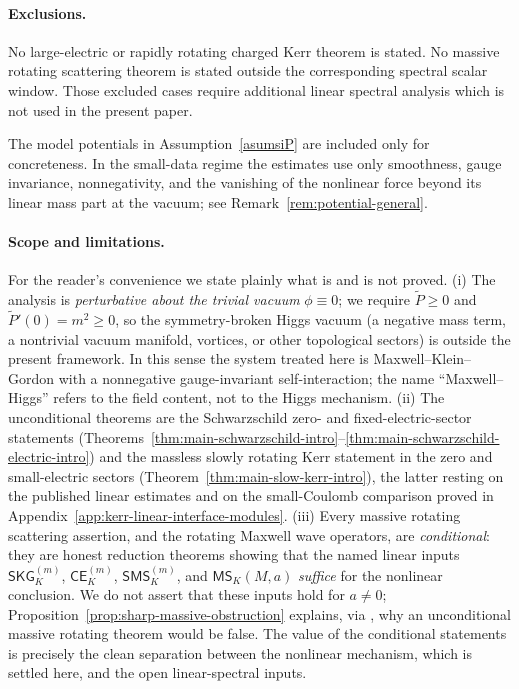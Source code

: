 \documentclass[11pt]{article}
\numberwithin{equation}{section}
\theoremstyle{plain}
\theoremstyle{definition}
\theoremstyle{remark}
\newcommand{\SKG}{\mathsf{SKG}}
\newcommand{\CElec}{\mathsf{CE}}
\newcommand{\MScat}{\mathsf{MS}}
\newcommand{\SMS}{\mathsf{SMS}}
\begin{document}
\paragraph{Exclusions.}
No large-electric or rapidly rotating charged Kerr theorem is stated.  No massive rotating scattering theorem is stated outside the corresponding spectral scalar window.  Those excluded cases require additional linear spectral analysis which is not used in the present paper.

The model potentials in Assumption~\ref{asumsiP} are included only for concreteness.  In the small-data regime the estimates use only smoothness, gauge invariance, nonnegativity, and the vanishing of the nonlinear force beyond its linear mass part at the vacuum; see Remark~\ref{rem:potential-general}.

\paragraph{Scope and limitations.}
For the reader's convenience we state plainly what is and is not proved.  (i) The analysis is \emph{perturbative about the trivial vacuum} $\phi\equiv0$; we require $\widetilde P\ge0$ and $\widetilde P'(0)=m^2\ge0$, so the symmetry-broken Higgs vacuum (a negative mass term, a nontrivial vacuum manifold, vortices, or other topological sectors) is outside the present framework.  In this sense the system treated here is Maxwell--Klein--Gordon with a nonnegative gauge-invariant self-interaction; the name ``Maxwell--Higgs'' refers to the field content, not to the Higgs mechanism.  (ii) The unconditional theorems are the Schwarzschild zero- and fixed-electric-sector statements (Theorems~\ref{thm:main-schwarzschild-intro}--\ref{thm:main-schwarzschild-electric-intro}) and the massless slowly rotating Kerr statement in the zero and small-electric sectors (Theorem~\ref{thm:main-slow-kerr-intro}), the latter resting on the published linear estimates \cite{DRSRKerr,DRSRKerrIII,AnderssonBlueMaxwellSlowKerr} and on the small-Coulomb comparison proved in Appendix~\ref{app:kerr-linear-interface-modules}.  (iii) Every massive rotating scattering assertion, and the rotating Maxwell wave operators, are \emph{conditional}: they are honest reduction theorems showing that the named linear inputs $\SKG_K^{(m)}$, $\CElec_K^{(m)}$, $\SMS_K^{(m)}$, and $\MScat_K(M,a)$ \emph{suffice} for the nonlinear conclusion.  We do not assert that these inputs hold for $a\ne0$; Proposition~\ref{prop:sharp-massive-obstruction} explains, via \cite{ShlapentokhRothmanKGKerr}, why an unconditional massive rotating theorem would be false.  The value of the conditional statements is precisely the clean separation between the nonlinear mechanism, which is settled here, and the open linear-spectral inputs.
\end{document}
